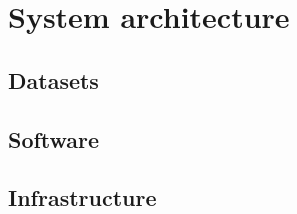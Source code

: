 
\chapter{System architecture}
\label{cha:system_architecture}

\section{Datasets}
\label{sec:datasets}


\section{Software}
\label{sec:software}


\section{Infrastructure}
\label{sec:infrastructure}
